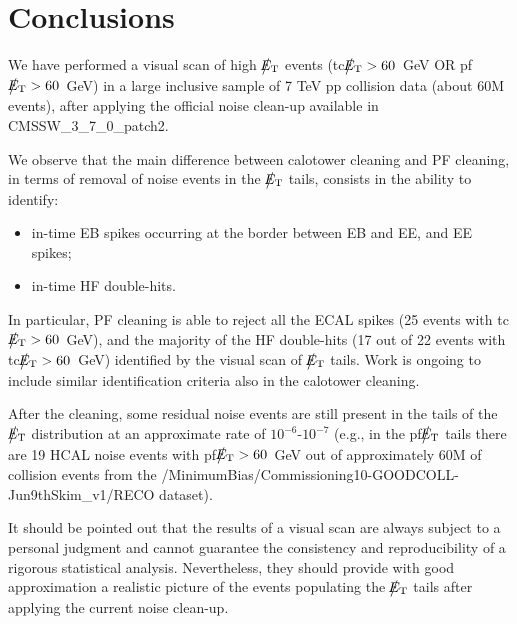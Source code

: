 \section{Conclusions}
We have performed a visual scan of high $\big\slash\hspace{-1.6ex}{E_\text{T}}$ events 
(tc$\big\slash\hspace{-1.6ex}{E_\text{T}}>60$~GeV OR pf$\big\slash\hspace{-1.6ex}{E_\text{T}}>60$~GeV)
in a large inclusive sample of 7 TeV pp collision data (about 60M events), 
after applying the official noise clean-up available in CMSSW\_3\_7\_0\_patch2.

We observe that the main difference between calotower cleaning and PF cleaning, in 
terms of removal of noise events in the $\big\slash\hspace{-1.6ex}{E_\text{T}}$ tails, consists in the ability to identify:
\begin{itemize}
\item in-time EB spikes occurring at the border between EB and EE, and EE spikes; 
\item in-time HF double-hits.
\end{itemize}

In particular, PF cleaning is able to reject all the ECAL spikes 
(25 events with tc$\big\slash\hspace{-1.6ex}{E_\text{T}}>60$~GeV), and the majority of the HF double-hits (17 out of 22 events with 
tc$\big\slash\hspace{-1.6ex}{E_\text{T}}>60$~GeV) identified by the visual scan of $\big\slash\hspace{-1.6ex}{E_\text{T}}$ tails.
Work is ongoing to include similar identification criteria also in the calotower cleaning.

After the cleaning, some residual noise events are still present in the tails 
of the $\big\slash\hspace{-1.6ex}{E_\text{T}}$ distribution at an approximate rate of $10^{-6}$-$10^{-7}$
(e.g., in the pf$\big\slash\hspace{-1.6ex}{E_\text{T}}$ tails there are 19 HCAL noise events with pf$\big\slash\hspace{-1.6ex}{E_\text{T}}>60$~GeV 
out of approximately 60M of collision events from 
the /MinimumBias/Commissioning10-GOODCOLL-Jun9thSkim\_v1/RECO dataset).

It should be pointed out that the results of a visual scan 
are always subject to a personal judgment and cannot guarantee 
the consistency and reproducibility of a rigorous statistical analysis. 
Nevertheless, they should provide with good approximation a realistic 
picture of the events populating the $\big\slash\hspace{-1.6ex}{E_\text{T}}$ tails after applying 
the current noise clean-up.


